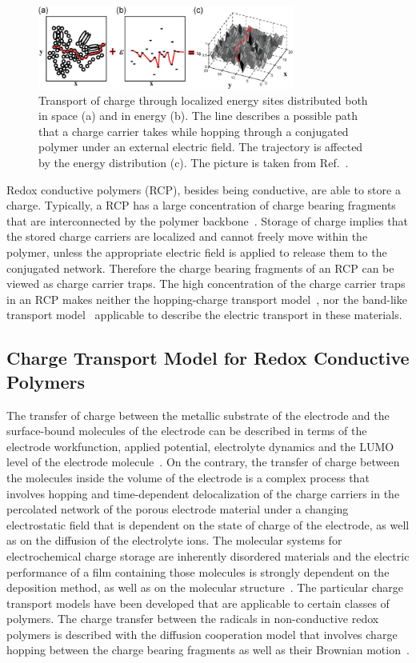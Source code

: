 \begin{figure} [h]
\centering
\includegraphics[width = 0.75\textwidth]{./electrochemistry/figures/hopping.png}
\caption{Transport of charge through localized energy sites distributed both in space (a) and in energy (b). The line describes a possible path that a charge carrier takes while hopping through a conjugated polymer under an external electric field. The trajectory is affected by the energy distribution (c). The picture is taken from Ref.~\cite{Tessler2009}.}
\label{fig:hopping}
\end{figure}

Redox conductive polymers (RCP), besides being conductive, are able to store a charge. Typically, a RCP has a large concentration of charge bearing fragments that are interconnected by the polymer backbone~\cite{Casado_2021_book}. Storage of charge implies that the stored charge carriers are localized and cannot freely move within the polymer, unless the appropriate electric field is applied to release them to the conjugated network. Therefore the charge bearing fragments of an RCP can be viewed as charge carrier traps. The high concentration of the charge carrier traps in an RCP makes neither the hopping-charge transport model~\cite{Sato2018}, nor the band-like transport model~\cite{Koehler_book} applicable to describe the electric transport in these materials.

\subsection{Charge Transport Model for Redox Conductive Polymers}  
The transfer of charge between the metallic substrate of the electrode and the surface-bound molecules of the electrode can be described in terms of the electrode workfunction, applied potential, electrolyte dynamics and the LUMO level of the electrode molecule~\cite{Bard_book}. 
On the contrary, the transfer of charge between the molecules inside the volume of the electrode is a complex process that involves hopping and time-dependent delocalization of the charge carriers in the percolated network of the porous electrode material under a changing electrostatic field that is dependent on the state of charge of the electrode, as well as on the diffusion of the electrolyte ions. The molecular systems for electrochemical charge storage are inherently disordered materials and the electric performance of a film containing those molecules is strongly dependent on the deposition method, as well as on the molecular structure~\cite{Xie2021,Zhang2018}. The particular charge transport models have been developed that are applicable to certain classes of polymers.  The charge transfer between the radicals in non-conductive redox polymers is described with the diffusion cooperation model that involves charge hopping between the charge bearing fragments as well as their Brownian motion~\cite{Sato2018}.

